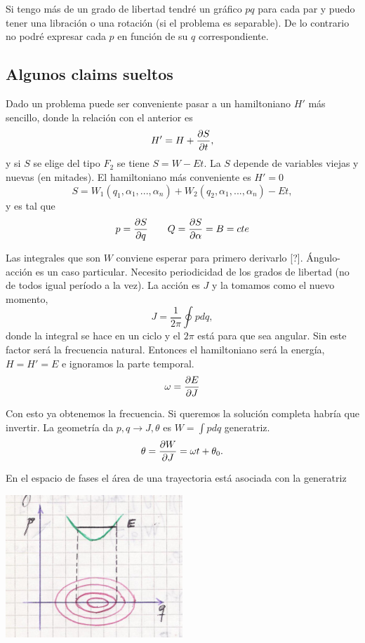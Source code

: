 \documentclass[10pt,oneside]{CBFT_book}
\begin{document}
Si tengo más de un grado de libertad tendré un gráfico $pq$ para cada par y puedo tener una
libración o una rotación (si el problema es separable). De lo contrario no podré expresar
cada $p$ en función de su $q$ correspondiente.

\subsection{Algunos claims sueltos}

Dado un problema puede ser conveniente pasar a un hamiltoniano $H'$ más sencillo, donde la relación
con el anterior es
\[
	H' = H + \frac{\partial^{\hspace{-0.05em}} {S}}{\partial {t}^{\hspace{-0.05em}}},
\]
y si $S$ se elige del tipo $F_2$ se tiene $S = W - Et$. La $S$ depende de variables viejas y nuevas
(en mitades). El hamiltoniano más conveniente es $H'=0$
\[
	S = W_1(q_1, \alpha_1, ..., \alpha_n) + W_2(q_2, \alpha_1, ..., \alpha_n) - Et,
\]
y es tal que 
\[
	p = \frac{\partial^{\hspace{-0.05em}} {S}}{\partial {q}^{\hspace{-0.05em}}} \qquad Q = \frac{\partial^{\hspace{-0.05em}} {S}}{\partial {\alpha}^{\hspace{-0.05em}}} = B = cte
\]

Las integrales que son $W$ conviene esperar para primero derivarlo [?].
Ángulo-acción es un caso particular.
Necesito periodicidad de los grados de libertad (no de todos igual período a la vez).
La acción es $J$ y la tomamos como el nuevo momento,
\[
	J = \frac{1}{2\pi } \oint p dq,
\]
donde la integral se hace en un ciclo y el $2\pi$ está para que sea angular. Sin este factor será
la frecuencia natural. Entonces el hamiltoniano será la energía, $H=H'=E$ e ignoramos la parte
temporal.
\[
	\omega = \frac{\partial^{\hspace{-0.05em}} {E}}{\partial {J}^{\hspace{-0.05em}}}
\]

Con esto ya obtenemos la frecuencia. Si queremos la solución completa habría que invertir.
La geometría da $p,q \to J,\theta$ es $W = \int pdq$ generatriz.
\[
	\theta = \frac{\partial^{\hspace{-0.05em}} {W}}{\partial {J}^{\hspace{-0.05em}}} = \omega t + \theta_0.
\]

En el espacio de fases el área de una trayectoria está asociada con la generatriz

\includegraphics[width=0.5\textwidth]{images/fig_mc_angacc.jpg}
\end{document}
